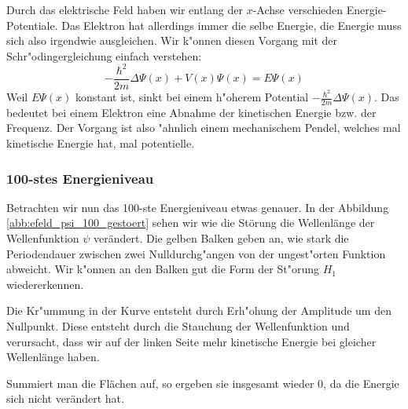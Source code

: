 \begin{refsection}
Durch das elektrische Feld haben wir entlang der $x$-Achse verschieden Energie-Potentiale.
Das Elektron hat allerdings immer die selbe Energie,
die Energie muss sich also irgendwie ausgleichen.
Wir k"onnen diesen Vorgang mit der Schr"odingergleichung einfach verstehen:
\[
-\frac{\hbar^2}{2m}\Delta\Psi(x) + V(x)\Psi(x)
=
E \Psi(x)
\]
Weil $E \Psi(x)$ konstant ist, sinkt bei einem h"oherem Potential $-\frac{\hbar^2}{2m}\Delta\Psi(x)$.
Das bedeutet bei einem Elektron eine Abnahme der kinetischen Energie bzw. der Frequenz.
Der Vorgang ist also "ahnlich einem mechanischem Pendel, 
welches mal kinetische Energie hat, mal potentielle.



\subsubsection{100-stes Energieniveau}
Betrachten wir nun das 100-ste Energieniveau etwas genauer.
In der Abbildung \ref{abb:efeld_psi_100_gestoert} sehen wir wie die St\"orung 
die Wellenl\"ange der Wellenfunktion $\psi$ ver\"andert. 
Die gelben Balken geben an, wie stark die Periodendauer zwischen zwei Nulldurchg"angen
von der ungest"orten Funktion abweicht.
Wir k"onnen an den Balken gut die Form der St"orung $H_1$ wiedererkennen.

Die Kr"ummung in der Kurve entsteht durch Erh"ohung der Amplitude um den Nullpunkt.
Diese entsteht durch die Stauchung der Wellenfunktion und verursacht, dass wir auf der linken Seite mehr kinetische Energie
bei gleicher Wellenl\"ange haben.

Summiert man die Fl\"achen auf, so ergeben sie insgesamt wieder $0$, da die Energie sich nicht ver\"andert hat.



\end{refsection}
